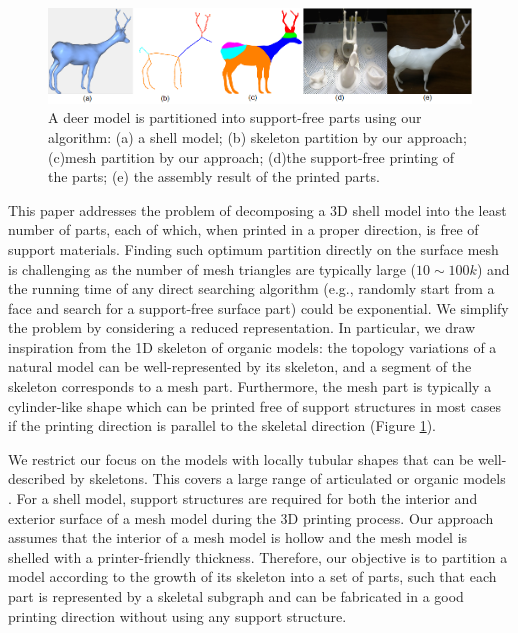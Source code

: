 \begin{figure}[t]
  \centering
  \includegraphics[width=\linewidth]{figs/tree_with_skeleton.png}
  \caption{\label{fig:ex1}%
  A deer model is partitioned into support-free parts using our algorithm: (a) a shell model; (b) skeleton partition by our approach; (c)mesh partition by our approach; (d)the support-free printing of the parts; (e) the assembly result of the printed parts.}
\end{figure}


This paper addresses the problem of decomposing a 3{D} shell model into the least number of parts, each of which, when printed in a proper direction, is free of support materials. {Finding such optimum partition directly on the surface mesh is challenging as the number of mesh triangles are typically large ($10\sim100k$) and the running time of any direct searching algorithm (e.g., randomly start from a face and search for a support-free surface part) could be exponential}. We simplify the problem by considering a reduced representation. In particular, we draw inspiration from the 1{D} skeleton of organic models: the topology variations of a natural model can be well-represented by its skeleton, and a {segment} of the skeleton corresponds to a mesh part. Furthermore, the mesh part is typically a cylinder-like shape which can be printed free of support structures in most cases if the printing direction is parallel to the skeletal direction (Figure \ref{fig:ex1}).

We restrict our focus on {the models with locally tubular shapes that} can be well-described by skeletons. This covers a large range of articulated or organic models \cite{tagliasacchi2009curve}. {{For a shell model}}, support structures are required for both the interior and exterior surface of a mesh model during the 3{D} printing process. Our approach assumes that the interior of a mesh model is hollow and the mesh model is shelled with a printer-friendly thickness. Therefore, our objective is to partition a model according to the growth of its skeleton into a set of parts, such that each part is represented by a skeletal subgraph and can be fabricated in a good printing direction without using any support structure. %


